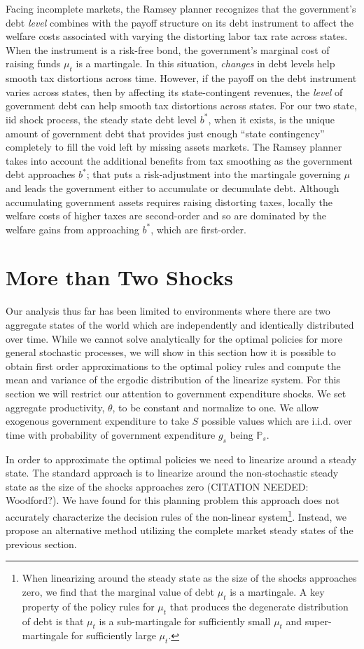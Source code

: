 \documentclass[12pt]{article}
\begin{document}
	  Facing incomplete markets, the  Ramsey planner recognizes that   the government's debt {\em level} combines with  the
 payoff structure on its debt instrument to affect  the welfare costs associated with varying the distorting labor tax rate across states.  When the
  instrument is a risk-free bond, the government's marginal cost of raising funds $\mu_t$ is  a martingale. In this situation,
    {\em changes} in debt levels  help smooth tax distortions across time.
	However, if the  payoff on the debt instrument varies across states, then  by affecting its state-contingent revenues, the {\em level} of government debt can help smooth tax distortions across states.
	For our two state, iid shock process,  the steady state debt level $b^*$, when it exists, is the unique amount of government debt
that provides just enough ``state contingency'' completely to fill the void left by  missing assets markets.  The Ramsey planner takes into account the additional benefits from tax smoothing as the government debt approaches $b^*$;  that puts a risk-adjustment into the martingale governing $\mu$ and leads the
 government either to accumulate or decumulate debt.
	 Although accumulating government assets requires  raising distorting  taxes, locally  the welfare costs of higher taxes are second-order and
so are  dominated by the welfare gains from approaching  $b^*$, which are first-order.

\section{More than Two Shocks}
Our analysis thus far has been limited to environments where there are two aggregate states of the world which are independently and identically distributed over time.  While we cannot solve analytically for the optimal policies for more general stochastic processes, we will show in this section how it is possible to obtain first order approximations to the optimal policy rules and compute the mean and variance of the ergodic distribution of the linearize system.  For this section we will restrict our attention to government expenditure shocks.   We set aggregate productivity, $\theta$, to be constant and normalize to one.  We allow exogenous government expenditure to take $S$ possible values which are i.i.d. over time with probability of government expenditure $g_s$  being $\mathbb P_s$. 

In order to approximate the optimal policies we need to linearize around a steady state.  The standard approach is to linearize around the non-stochastic steady state as the size of the shocks approaches zero {\color{red}(CITATION NEEDED: Woodford?)}.  We have found for this planning problem this approach does not accurately characterize the decision rules of the non-linear system\footnote{When linearizing around the steady state as the size of the shocks approaches zero, we find that the marginal value of debt $\mu_t$ is a martingale.  A key property of the policy rules for $\mu_t$ that produces the degenerate distribution of debt is that $\mu_t$ is a sub-martingale for sufficiently small $\mu_t$ and super-martingale for sufficiently large $\mu_t$.}.  Instead, we propose an alternative method utilizing the complete market steady states of the previous section.
\end{document}
